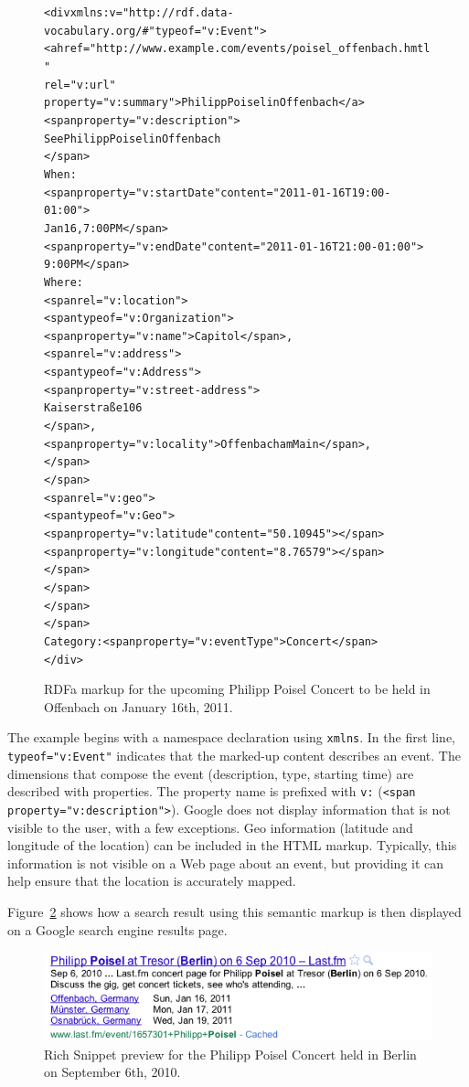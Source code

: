 \documentclass[12pt]{article}
\newenvironment{code}[1]
{\begin{lrbox}{\inverbatim}\begin{minipage}{13.5cm}\begin{alltt}{#1}}
{\end{alltt}\end{minipage}\end{lrbox}\colorbox{lightgray}{\usebox{\inverbatim}}}
\begin{document}
\begin{figure}[htbp!]
\begin{center}
{\footnotesize
\begin{code}
<div xmlns:v="http://rdf.data-vocabulary.org/#" typeof="v:Event">
  <a href="http://www.example.com/events/poisel_offenbach.hmtl"
     rel="v:url"
     property="v:summary">Philipp Poisel in Offenbach</a>
  <span property="v:description">
    See Philipp Poisel in Offenbach
  </span>
  When:
  <span property="v:startDate" content="2011-01-16T19:00-01:00">
    Jan 16, 7:00PM</span>
  <span property="v:endDate" content="2011-01-16T21:00-01:00">
    9:00PM</span>
  Where:
  <span rel="v:location">
    <span typeof="v:Organization">
      <span property="v:name">Capitol</span>,
      <span rel="v:address">
        <span typeof="v:Address">
          <span property="v:street-address">
            Kaiserstraße 106
          </span>,
          <span property="v:locality">Offenbach am Main</span>,
        </span>
      </span>
      <span rel="v:geo">
        <span typeof="v:Geo">
          <span property="v:latitude" content="50.10945"></span>
          <span property="v:longitude" content="8.76579" ></span>
        </span>
      </span>
    </span>
  </span>
  Category: <span property="v:eventType">Concert</span>
</div>
\end{code}}
  \caption{RDFa markup for the upcoming Philipp Poisel Concert to be held in Offenbach on January 16th, 2011.}
  \label{code:poisel-rdfa}
  \end{center}  
\end{figure}

The example begins with a namespace declaration using \texttt{xmlns}. In the first line, \texttt{typeof="v:Event"} indicates that the marked-up content describes an event. The dimensions that compose the event (description, type, starting time) are described with properties. The property name is prefixed with \texttt{v:} (\texttt{<span proper\-ty="v:description">}). Google does not display information that is not visible to the user, with a few exceptions. Geo information (latitude and longitude of the location) can be included in the HTML markup. Typically, this information is not visible on a Web page about an event, but providing it can help ensure that the location is accurately mapped.

Figure~\ref{fig:poisel-rich-snippet} shows how a search result using this semantic markup is then displayed on a Google search engine results page. 
\begin{figure}[htbp!]
\begin{center}
 \includegraphics[width=\linewidth]{./resources/rich-snippets-poisel.png}
 \caption{Rich Snippet preview for the Philipp Poisel Concert held in Berlin on September 6th, 2010.}
 \label{fig:poisel-rich-snippet}
 \end{center}  
\end{figure}
\end{document}
